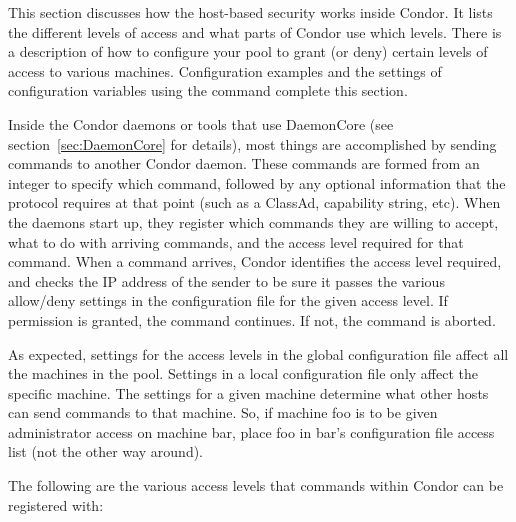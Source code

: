 This section discusses how the host-based security works inside Condor.
It lists the different levels of access and what
parts of Condor use which levels.
There is a description of how to configure
your pool to grant (or deny) certain levels of access to various
machines.
Configuration examples and the settings of configuration variables
using the  command complete this section.

Inside the Condor daemons or tools that use DaemonCore (see
section~\ref{sec:DaemonCore} for details), most
things are accomplished by sending commands to another Condor daemon.
These commands are formed from an integer to specify which command,
followed
by any optional information that the protocol requires at that point
(such as a ClassAd, capability string, etc).
When the daemons start up,
they register which commands they are willing to accept, what to
do with arriving commands, and the access level required for
that command.
When a command arrives, Condor identifies the  access level
required, and checks the IP address of the sender to be
sure it passes the various allow/deny settings
in the configuration file for the given access level.
If permission is granted, the command continues. 
If not, the command is aborted.

As expected, settings for the access levels in the global
configuration file affect all the machines in the pool.
Settings in a local configuration file only affect the specific machine.
The settings for a given machine determine what other hosts can send
commands to that machine.
So, if machine foo is to be given 
administrator access on machine bar, place foo in
bar's configuration file access list (not the other way around).


The following are the various access levels that commands within
Condor can be registered with:

